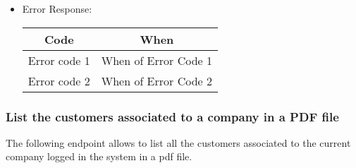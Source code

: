 \begin{itemize}
    \item Error Response:
    \begin{table}[!h]
    \centering 
    \begin{tabular}{|c|c|}
    \hline
    \multicolumn{1}{|c|}{\textbf{Code}} & \multicolumn{1}{c|}{\textbf{When}} \\ \hline
    Error code 1 & When of Error Code 1 \\\hline
    Error code 2 & When of Error Code 2 \\\hline
    \end{tabular} 
    \end{table} 
    
\end{itemize}


\subsubsection*{List the customers associated to a company in a PDF file}

The following endpoint allows to list all the customers associated to the current company logged in the system in a pdf file.

